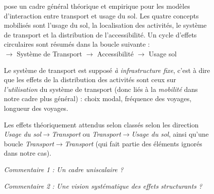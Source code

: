 \begin{figure}[h!]
	\begin{mdframed}
		
		\cite{wegener2004land} pose un cadre général théorique et empirique pour les modèles d'interaction entre transport et usage du sol. Les quatre concepts mobilisés sont l'usage du sol, la localisation des activités, le système de transport et la distribution de l'accessibilité. Un cycle d'effets circulaires sont résumés dans la boucle suivante :\\
		\medskip
		{\centering
		  $\longrightarrow$ Système de Transport $\longrightarrow$ Accessibilité $\longrightarrow$ Usage  sol
		}
		\medskip
		
		Le système de transport est supposé \emph{à infrastructure fixe}, c'est à dire que les effets de la distribution des activités sont ceux sur \emph{l'utilisation} du système de transport (donc liés à la \emph{mobilité} dans notre cadre plus général) : choix modal, fréquence des voyages, longueur des voyages.
		
		Les effets théoriquement attendus selon classés selon les direction \textit{Usage du sol}$\rightarrow$\textit{Transport} ou \textit{Transport}$\rightarrow$\textit{Usage du sol}, ainsi qu'une boucle \textit{Transport}$\rightarrow$\textit{Transport} (qui fait partie des éléments ignorés dans notre cas).
		
		\bigskip
		
		\textit{Commentaire 1 : Un cadre uniscalaire ?}
		
		\bigskip
		
		\textit{Commentaire 2 : Une vision systématique des effets structurants ?}
		
		
	\end{mdframed}
\end{figure}




